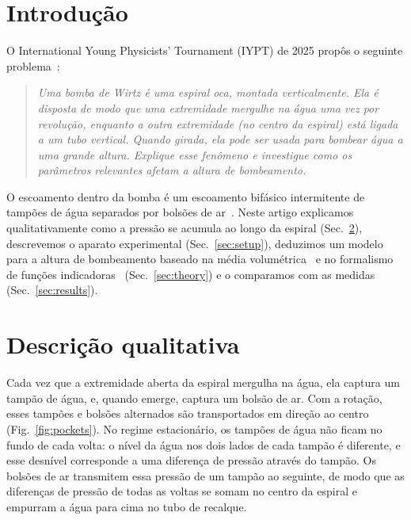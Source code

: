 \documentclass[aps,pre,twocolumn,superscriptaddress,nofootinbib,floatfix]{revtex4-2}
\begin{document}
\maketitle

\section{Introdução}
\label{sec:intro}

O International Young Physicists' Tournament (IYPT) de 2025 propôs o seguinte problema~\cite{iypt2025}:
\begin{quote}
\emph{Uma bomba de Wirtz é uma espiral oca, montada verticalmente. Ela é disposta de modo que uma extremidade mergulhe na água uma vez por revolução, enquanto a outra extremidade (no centro da espiral) está ligada a um tubo vertical. Quando girada, ela pode ser usada para bombear água a uma grande altura. Explique esse fenômeno e investigue como os parâmetros relevantes afetam a altura de bombeamento.}
\end{quote}
O escoamento dentro da bomba é um escoamento bifásico intermitente de tampões de água separados por bolsões de ar~\cite{ishii2011}. Neste artigo explicamos qualitativamente como a pressão se acumula ao longo da espiral (Sec.~\ref{sec:qualitative}), descrevemos o aparato experimental (Sec.~\ref{sec:setup}), deduzimos um modelo para a altura de bombeamento baseado na média volumétrica~\cite{whitaker1999} e no formalismo de funções indicadoras~\cite{drew1983} (Sec.~\ref{sec:theory}) e o comparamos com as medidas (Sec.~\ref{sec:results}).

\section{Descrição qualitativa}
\label{sec:qualitative}

Cada vez que a extremidade aberta da espiral mergulha na água, ela captura um tampão de água, e, quando emerge, captura um bolsão de ar. Com a rotação, esses tampões e bolsões alternados são transportados em direção ao centro (Fig.~\ref{fig:pockets}). No regime estacionário, os tampões de água não ficam no fundo de cada volta: o nível da água nos dois lados de cada tampão é diferente, e esse desnível corresponde a uma diferença de pressão através do tampão. Os bolsões de ar transmitem essa pressão de um tampão ao seguinte, de modo que as diferenças de pressão de todas as voltas se somam no centro da espiral e empurram a água para cima no tubo de recalque.
\end{document}
